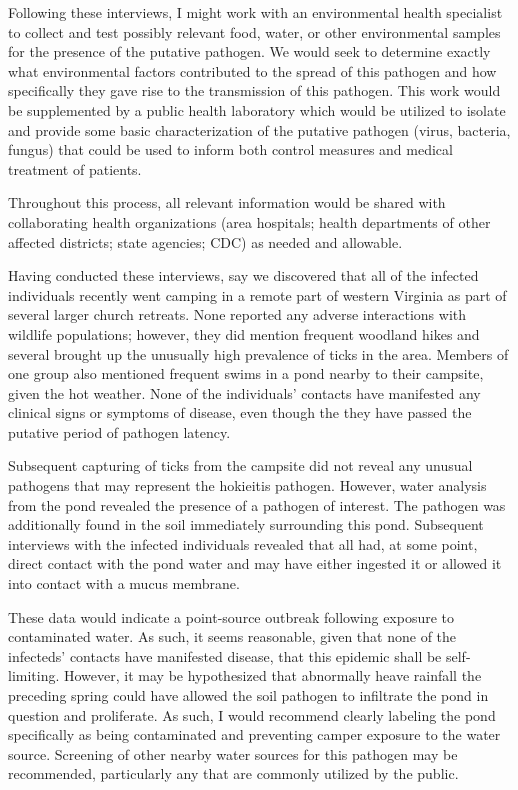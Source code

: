 \documentclass[11pt,letterpaper,final] {article}
\begin{document}
Following these interviews, I might work with an environmental health specialist to collect and test possibly relevant food, water, or other environmental samples for the presence of the putative pathogen. We would seek to determine exactly what environmental factors contributed to the spread of this pathogen and how specifically they gave rise to the transmission of this pathogen. This work would be supplemented by a public health laboratory which would be utilized to isolate and provide some basic characterization of the putative pathogen (virus, bacteria, fungus) that could be used to inform both control measures and medical treatment of patients.

Throughout this process, all relevant information would be shared with collaborating health organizations (area hospitals; health departments of other affected districts; state agencies; CDC) as needed and allowable.

Having conducted these interviews, say we discovered that all of the infected individuals recently went camping in a remote part of western Virginia as part of several larger church retreats. None reported any adverse interactions with wildlife populations; however, they did mention frequent woodland hikes and several brought up the unusually high prevalence of ticks in the area. Members of one group also mentioned frequent swims in a pond nearby to their campsite, given the hot weather. None of the individuals' contacts have manifested any clinical signs or symptoms of disease, even though the they have passed the putative period of pathogen latency.

Subsequent capturing of ticks from the campsite did not reveal any unusual pathogens that may represent the hokieitis pathogen. However, water analysis from the pond revealed the presence of a pathogen of interest. The pathogen was additionally found in the soil immediately surrounding this pond. Subsequent interviews with the infected individuals revealed that all had, at some point, direct contact with the pond water and may have either ingested it or allowed it into contact with a mucus membrane.

These data would indicate a point-source outbreak following exposure to contaminated water. As such, it seems reasonable, given that none of the infecteds' contacts have manifested disease, that this epidemic shall be self-limiting. However, it may be hypothesized that abnormally heave rainfall the preceding spring could have allowed the soil pathogen to infiltrate the pond in question and proliferate. As such, I would recommend clearly labeling the pond specifically as being contaminated and preventing camper exposure to the water source. Screening of other nearby water sources for this pathogen may be recommended, particularly any that are commonly utilized by the public.
\end{document}
